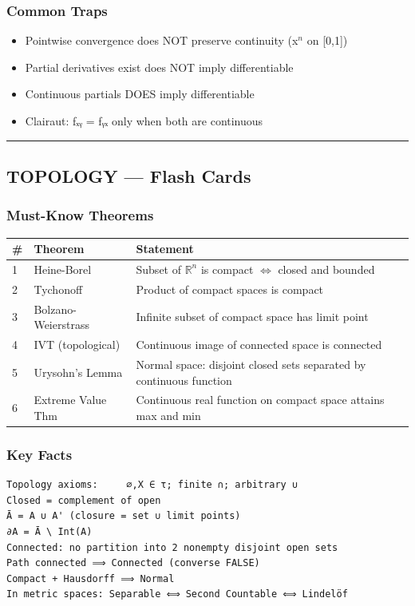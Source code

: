 \documentclass[12pt,a4paper,openany]{book}
\begin{document}
{{\subsubsection{ Common Traps}
\begin{itemize}[leftmargin=*]
  \item Pointwise convergence does NOT preserve continuity (x$^n$ on [0,1])
  \item Partial derivatives exist does NOT imply differentiable
  \item Continuous partials DOES imply differentiable
  \item Clairaut: fₓᵧ = fᵧₓ only when both are continuous
\end{itemize}

\bigskip\noindent\rule{\textwidth}{0.4pt}\bigskip

\subsection{ TOPOLOGY — Flash Cards}

\subsubsection{Must-Know Theorems}
\begin{center}
\begin{tabular}{|l|l|l|}
\hline
\textbf{#} & \textbf{Theorem} & \textbf{Statement} \\
\hline
1 & Heine-Borel & Subset of $\mathbb{R}^n$ is compact $\Longleftrightarrow$ closed and bounded \\
\hline
2 & Tychonoff & Product of compact spaces is compact \\
\hline
3 & Bolzano-Weierstrass & Infinite subset of compact space has limit point \\
\hline
4 & IVT (topological) & Continuous image of connected space is connected \\
\hline
5 & Urysohn's Lemma & Normal space: disjoint closed sets separated by continuous function \\
\hline
6 & Extreme Value Thm & Continuous real function on compact space attains max and min \\
\hline
\end{tabular}
\end{center}

\subsubsection{Key Facts}
\begin{verbatim}
Topology axioms:     ∅,X ∈ τ; finite ∩; arbitrary ∪
Closed = complement of open
Ā = A ∪ A' (closure = set ∪ limit points)
∂A = Ā \ Int(A)
Connected: no partition into 2 nonempty disjoint open sets
Path connected ⟹ Connected (converse FALSE)
Compact + Hausdorff ⟹ Normal
In metric spaces: Separable ⟺ Second Countable ⟺ Lindelöf
\end{verbatim}

}}
\end{document}
